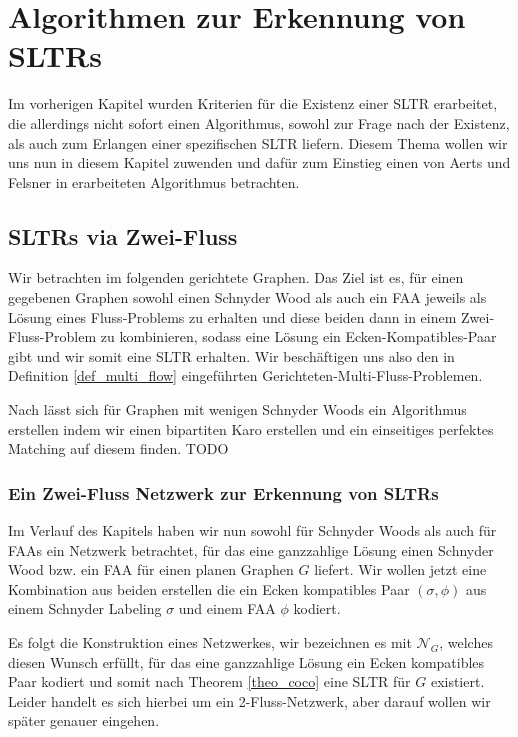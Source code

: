\chapter{Algorithmen zur Erkennung von SLTRs}\label{main_algo}

Im vorherigen Kapitel wurden Kriterien für die Existenz einer SLTR erarbeitet, die allerdings nicht sofort einen Algorithmus, sowohl zur Frage nach der Existenz, als auch zum Erlangen einer spezifischen SLTR liefern. Diesem Thema wollen wir uns nun in diesem Kapitel zuwenden und dafür zum Einstieg einen von Aerts und Felsner in \cite{af15} erarbeiteten Algorithmus betrachten.

\section{SLTRs via Zwei-Fluss}

Wir betrachten im folgenden gerichtete Graphen. Das Ziel ist es, für einen gegebenen Graphen sowohl einen Schnyder Wood als auch ein FAA jeweils als Lösung eines Fluss-Problems zu erhalten und diese beiden dann in einem Zwei-Fluss-Problem zu kombinieren, sodass eine Lösung ein Ecken-Kompatibles-Paar gibt und wir somit eine SLTR erhalten. Wir beschäftigen uns also den in Definition \ref{def_multi_flow} eingeführten Gerichteten-Multi-Fluss-Problemen.



\begin{remark}

Nach \cite{af15} lässt sich für Graphen mit wenigen Schnyder Woods ein Algorithmus erstellen indem wir einen bipartiten Karo erstellen und ein einseitiges perfektes Matching auf diesem finden. TODO

\end{remark}

\subsection{Ein Zwei-Fluss Netzwerk zur Erkennung von SLTRs}

Im Verlauf des Kapitels haben wir nun sowohl für Schnyder Woods als auch für FAAs ein Netzwerk betrachtet, für das eine ganzzahlige Lösung einen Schnyder Wood bzw. ein FAA für einen planen Graphen $G$ liefert. Wir wollen jetzt eine Kombination aus beiden erstellen die ein Ecken kompatibles Paar $(\sigma,\phi)$ aus einem Schnyder Labeling $\sigma$ und einem FAA $\phi$  kodiert.\

Es folgt die Konstruktion eines Netzwerkes, wir bezeichnen es mit $\mathcal{N}_G$, welches diesen Wunsch erfüllt, für das eine ganzzahlige Lösung ein Ecken kompatibles Paar kodiert und somit nach Theorem \ref{theo_coco} eine SLTR für $G$ existiert. Leider handelt es sich hierbei um ein 2-Fluss-Netzwerk, aber darauf wollen wir später genauer eingehen.\\

